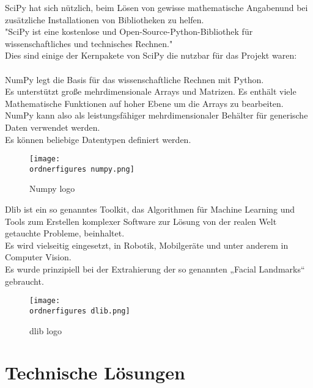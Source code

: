 SciPy hat sich nützlich, beim Lösen von gewisse mathematische Angabenund bei zusätzliche Installationen von Bibliotheken zu helfen.\\ 
"SciPy ist eine kostenlose und Open-Source-Python-Bibliothek für wissenschaftliches und technisches Rechnen."\cite{2019arXiv190710121V-scipy}
 \\ 
Dies sind einige der Kernpakete von SciPy die nutzbar für das Projekt waren:\\ 
 \\ 
NumPy legt die Basis für das wissenschaftliche Rechnen mit Python.\\ Es unterstützt große mehrdimensionale Arrays und Matrizen. Es enthält viele Mathematische Funktionen auf hoher Ebene um die Arrays zu bearbeiten.\\
NumPy kann also als leistungsfähiger mehrdimensionaler Behälter für generische Daten verwendet werden.\\ Es können beliebige Datentypen definiert werden.
\\
\begin{figure}[H]
	\texttt{[image: \\ordnerfigures numpy.png]}
	\caption{Numpy logo}
	\label{fig:Numpy logo}
	\cite{Numpy}
\end{figure}

Dlib ist ein so genanntes Toolkit, das Algorithmen für Machine Learning und Tools zum Erstellen komplexer Software zur Lösung von der realen Welt getauchte Probleme, beinhaltet.\\
Es wird vielseitig eingesetzt, in Robotik, Mobilgeräte und unter anderem in Computer Vision.\cite{dlib} \\
Es wurde prinzipiell bei der Extrahierung der so genannten „Facial Landmarks“ gebraucht. 

\begin{figure}[H]
	\texttt{[image: \\ordnerfigures dlib.png]}
	\caption{dlib logo}
	\cite{dlib}
	\label{fig:dlib logo}
\end{figure}


\section{Technische Lösungen}

